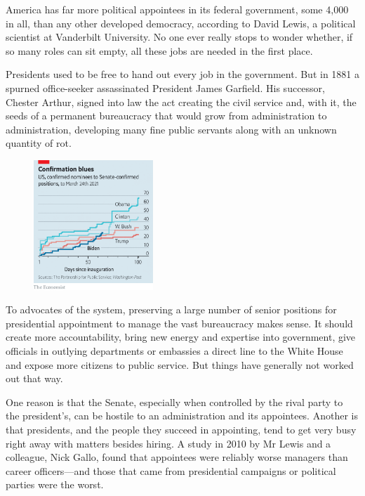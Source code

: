 \documentclass{article}
\begin{document}
America has far more political appointees in its federal government, some 4,000 in all, than any other developed democracy, according to David Lewis, a political scientist at Vanderbilt University. No one ever really stops to wonder whether, if so many roles can sit empty, all these jobs are needed in the first place. 

Presidents used to be free to hand out every job in the government. But in 1881 a spurned office-seeker assassinated President James Garfield. His successor, Chester Arthur, signed into law the act creating the civil service and, with it, the seeds of a permanent bureaucracy that would grow from administration to administration, developing many fine public servants along with an unknown quantity of rot. 

\begin{figure}[h]
\centering
\includegraphics[width=0.4\textwidth]{images/20210327_usc258.png}
\end{figure}


To advocates of the system, preserving a large number of senior positions for presidential appointment to manage the vast bureaucracy makes sense. It should create more accountability, bring new energy and expertise into government, give officials in outlying departments or embassies a direct line to the White House and expose more citizens to public service. But things have generally not worked out that way. 

One reason is that the Senate, especially when controlled by the rival party to the president's, can be hostile to an administration and its appointees. Another is that presidents, and the people they succeed in appointing, tend to get very busy right away with matters besides hiring. A study in 2010 by Mr Lewis and a colleague, Nick Gallo, found that appointees were reliably worse managers than career officers---and those that came from presidential campaigns or political parties were the worst. 
\end{document}
